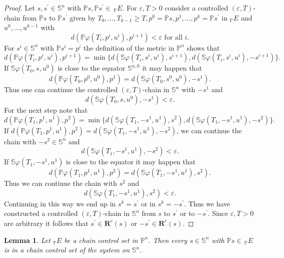 \documentclass[preprint,12pt]{elsarticle}
\newtheorem{lemma}{Lemma}
\begin{document}
\begin{proof}
Let $s,s^{\prime}\in\mathbb{S}^{n}$ with $\mathbb{P}s,\mathbb{P}s^{\prime}%
\in\,_{\mathbb{P}}E$. For $\varepsilon,T>0$ consider a controlled
$(\varepsilon,T)$-chain from $\mathbb{P}s$ to $\mathbb{P}s^{\prime}$ given by
$T_{0},\ldots,T_{k-1}\geq T,p^{0}=\mathbb{P}s,p^{1},\ldots,p^{k}%
=\mathbb{P}s^{\prime}$ in $_{\mathbb{P}}E$ and $u^{0},\ldots,u^{k-1}$ with%
\[
d(\mathbb{P}\varphi(T_{i},p^{i},u^{i}),p^{i+1})<\varepsilon\text{ for all }i.
\]
For $s^{i}\in\mathbb{S}^{n}$ with $\mathbb{P}s^{i}=p^{i}$ the definition of
the metric in $\mathbb{P}^{n}$ shows that%
\[
d(\mathbb{P}\varphi(T_{i},p^{i},u^{i}),p^{i+1})=\min\{d(\mathbb{S}%
\varphi(T_{i},s^{i},u^{i}),s^{i+1}),d(\mathbb{S}\varphi(T_{i},s^{i}%
,u^{i}),-s^{i+1})\}.
\]
If $\mathbb{S}\varphi(T_{0},s,u^{0})$ is close to the equator $\mathbb{S}%
^{n,0}$ it may happen that%
\[
d(\mathbb{P}\varphi(T_{0},p^{0},u^{0}),p^{1})=d(\mathbb{S}\varphi(T_{0}%
,s^{0},u^{0}),-s^{1}).
\]
Thus one can continue the controlled $(\varepsilon,T)$-chain in $\mathbb{S}%
^{n}$ with $-s^{1}$ and%
\[
d(\mathbb{S}\varphi(T_{0},s,u^{0}),-s^{1})<\varepsilon.
\]
For the next step note that%
\[
d(\mathbb{P}\varphi(T_{1},p^{1},u^{1}),p^{2})=\min\{d(\mathbb{S}\varphi
(T_{1},-s^{1},u^{1}),s^{2}),d(\mathbb{S}\varphi(T_{1},-s^{1},u^{1}%
),-s^{2})\}.
\]
If $d(\mathbb{P}\varphi(T_{1},p^{1},u^{1}),p^{2})=d(\mathbb{S}\varphi
(T_{1},-s^{1},u^{1}),-s^{2})$, we can continue the chain with $-s^{2}%
\in\mathbb{S}^{n}$ and%
\[
d(\mathbb{S}\varphi(T_{1},-s^{1},u^{1}),-s^{2})<\varepsilon.
\]
If $\mathbb{S}\varphi(T_{1},-s^{1},u^{1})$ is close to the equator it may
happen that%
\[
d(\mathbb{P}\varphi(T_{1},p^{1},u^{1}),p^{2})=d(\mathbb{S}\varphi(T_{1}%
,-s^{1},u^{1}),s^{2}).
\]
Thus we can continue the chain with $s^{2}$ and%
\[
d(\mathbb{S}\varphi(T_{1},-s^{1},u^{1}),s^{2})<\varepsilon.
\]
Continuing in this way we end up in $s^{k}=s^{\prime}$ or in $s^{k}%
=-s^{\prime}$. Thus we have constructed a controlled $(\varepsilon,T)$-chain
in $\mathbb{S}^{n}$ from $s$ to $s^{\prime}$ or to $-s^{\prime}$. Since
$\varepsilon,T>0$ are arbitrary it follows that $s^{\prime}\in\mathbf{R}%
^{c}(s)$ or $-s^{\prime}\in\mathbf{R}^{c}(s)$.
\end{proof}

\begin{lemma}
\label{Lemma_allS}Let $_{\mathbb{P}}E$ be a chain control set in
$\mathbb{P}^{n}$. Then every $s\in\mathbb{S}^{n}$ with $\mathbb{P}%
s\in\,_{\mathbb{P}}E$ is in a chain control set of the system on
$\mathbb{S}^{n}$.
\end{lemma}
\end{document}
